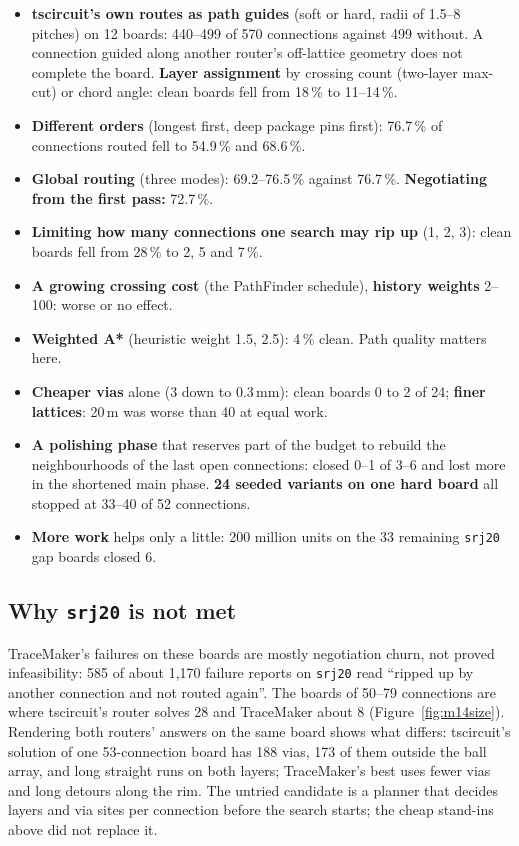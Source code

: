 \documentclass[10pt,a4paper]{article}
\begin{document}
\begin{itemize}[leftmargin=*]
  \item \textbf{tscircuit's own routes as path guides} (soft or hard, radii of 1.5--8 pitches) on 12 boards: 440--499 of
  570 connections against 499 without. A connection guided along another router's off-lattice geometry does not
  complete the board. \textbf{Layer assignment} by crossing count (two-layer max-cut) or chord angle: clean boards fell from 18\,\% to 11--14\,\%.
  \item \textbf{Different orders} (longest first, deep package pins first): 76.7\,\% of connections routed fell to 54.9\,\% and 68.6\,\%.
  \item \textbf{Global routing} (three modes): 69.2--76.5\,\% against 76.7\,\%. \textbf{Negotiating from the first pass:} 72.7\,\%.
  \item \textbf{Limiting how many connections one search may rip up} (1, 2, 3): clean boards fell from 28\,\% to 2, 5 and 7\,\%.
  \item \textbf{A growing crossing cost} (the PathFinder schedule), \textbf{history weights} 2--100: worse or no effect.
  \item \textbf{Weighted A*} (heuristic weight 1.5, 2.5): 4\,\% clean. Path quality matters here.
  \item \textbf{Cheaper vias} alone (3 down to 0.3\,mm): clean boards 0 to 2 of 24; \textbf{finer lattices}: 20\,\textmu m was worse than 40 at equal work.
  \item \textbf{A polishing phase} that reserves part of the budget to rebuild the neighbourhoods of the last open
  connections: closed 0--1 of 3--6 and lost more in the shortened main phase. \textbf{24 seeded variants on one hard board} all stopped at 33--40 of 52 connections.
  \item \textbf{More work} helps only a little: 200 million units on the 33 remaining \texttt{srj20} gap boards closed 6.
\end{itemize}

\subsection{Why \texttt{srj20} is not met}

TraceMaker's failures on these boards are mostly negotiation churn, not proved infeasibility: 585 of about 1,170 failure
reports on \texttt{srj20} read ``ripped up by another connection and not routed again''. The boards of 50--79 connections
are where tscircuit's router solves 28 and TraceMaker about 8 (Figure~\ref{fig:m14size}). Rendering both routers' answers on
the same board shows what differs: tscircuit's solution of one 53-connection board has 188 vias, 173 of them outside the
ball array, and long straight runs on both layers; TraceMaker's best uses fewer vias and long detours along the rim.
The untried candidate is a planner that decides layers and via sites per connection before the search starts; the cheap
stand-ins above did not replace it.
\end{document}
